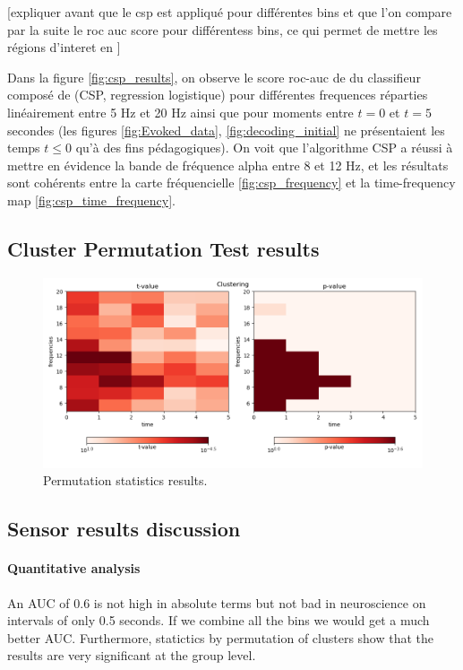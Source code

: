 [expliquer avant que le csp est appliqué pour différentes bins et que l'on compare par la suite le roc auc score pour différentess bins, ce qui permet de mettre les régions d'interet en ]

Dans la figure \ref{fig:csp_results}, on observe le score roc-auc de du classifieur composé de (CSP, regression logistique) pour différentes frequences réparties linéairement entre 5 Hz et 20 Hz ainsi que pour moments entre $t=0$ et $t=5$ secondes (les figures \ref{fig:Evoked_data}, \ref{fig:decoding_initial} ne présentaient les temps $t \leq 0$ qu'à des fins pédagogiques). On voit que l'algorithme CSP a réussi à mettre en évidence la bande de fréquence alpha entre 8 et 12 Hz, et les résultats sont cohérents entre la carte fréquencielle \ref{fig:csp_frequency} et la time-frequency map \ref{fig:csp_time_frequency}.

\subsection{Cluster Permutation Test results}

\begin{figure}[ht]
    \centering
    \includegraphics[width=15cm]{images_report/sensor/csp_permutation_res/permutations_test.png}
    \caption[Permutation statistics results.]%
    {Permutation statistics results.}
    \label{permutation_statistics_results}
\end{figure}

\subsection{Sensor results discussion}

\paragraph{Quantitative analysis}
An AUC of 0.6 is not high in absolute terms but not bad in neuroscience on intervals of only 0.5 seconds. If we combine all the bins we would get a much better AUC. Furthermore, statictics by permutation of clusters show that the results are very significant at the group level.

